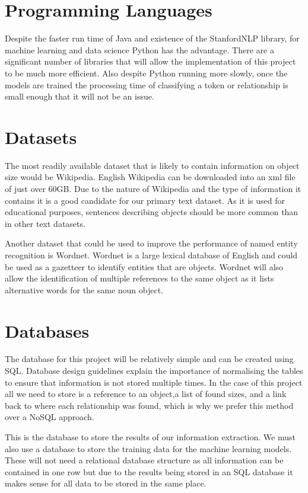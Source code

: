 \documentclass[11pt,oneside]{book}
\begin{document}
\section{Programming Languages}
Despite the faster run time of Java and existence of the StanfordNLP library, for machine learning and data science Python has the advantage. There are a significant number of libraries that will allow the implementation of this project to be much more efficient. Also despite Python running more slowly, once the models are trained the processing time of classifying a token or relationship is small enough that it will not be an issue.

\section{Datasets}
The most readily available dataset that is likely to contain information on object size would be Wikipedia. English Wikipedia can be downloaded into an xml file of just over 60GB. Due to the nature of Wikipedia and the type of information it contains it is a good candidate for our primary text dataset. As it is used for educational purposes, sentences describing objects should be more common than in other text datasets.

Another dataset that could be used to improve the performance of named entity recognition is Wordnet. Wordnet is a large lexical database of English and could be used as a gazetteer to identify entities that are objects. Wordnet will also allow the identification of multiple references to the same object as it lists alternative words for the same noun object.

\section{Databases}
The database for this project will be relatively simple and can be created using SQL. Database design guidelines explain the importance of normalising the tables to ensure that information is not stored multiple times. In the case of this project all we need to store is a reference to an object,a list of found sizes, and a link back to where each relationship was found, which is why we prefer this method over a NoSQL approach.

This is the database to store the results of our information extraction. We must also use a database to store the training data for the machine learning models. These will not need a relational database structure as all information can be contained in one row but due to the results being stored in an SQL database it makes sense for all data to be stored in the same place.
\end{document}
